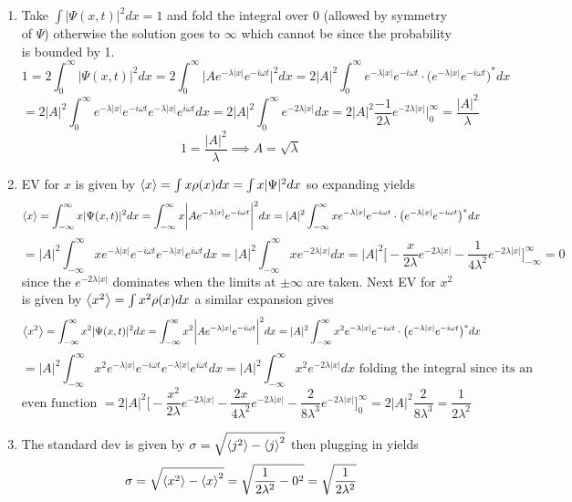 \documentclass[12pt]{exam}
\begin{document}
\begin{solution}
    \begin{enumerate}
        \item Take $\int |\Psi(x,t)|^2dx =1$ and fold the integral over 0 (allowed by symmetry of $\Psi$) otherwise the solution goes to $\infty$ which cannot be since the probability is bounded by 1. 
        $$1=2\int^\infty_0 |\Psi(x,t)|^2dx = 2\int^\infty_0 \bigg|Ae^{-\lambda|x|}e^{-i\omega t}\bigg|^2dx = 2|A|^2\int^\infty_0 e^{-\lambda|x|}e^{-i\omega t} \cdot\big(e^{-\lambda|x|}e^{-i\omega t}\big)^*dx$$
        $$= 2|A|^2\int^\infty_0 e^{-\lambda|x|}e^{-i\omega t} e^{-\lambda|x|}e^{i\omega t}dx = 2|A|^2\int^\infty_0 e^{-2\lambda|x|} dx  = 2|A|^2\frac{-1}{2\lambda}e^{-2\lambda|x|} \bigg|^\infty_0 = \frac{|A|^2}{\lambda}$$
        $$1=\frac{|A|^2}{\lambda}\implies A = \sqrt{\lambda}$$

        \item EV for $x$ is given by $\expval{x} = \int x \rho(x)dx = \int x |\Psi|^2dx$ so expanding yields 
        $$\expval{x} = \int^\infty_{-\infty} x|\Psi(x,t)|^2dx = \int^\infty_{-\infty} x\bigg |Ae^{-\lambda|x|} e^{-i\omega t}\bigg|^2dx = |A|^2\int^\infty_{-\infty} xe^{-\lambda|x|}e^{-i\omega t} \cdot\big(e^{-\lambda|x|}e^{-i\omega t}\big)^*dx$$
        $$= |A|^2\int^\infty_{-\infty} xe^{-\lambda|x|}e^{-i\omega t} e^{-\lambda|x|}e^{i\omega t}dx = |A|^2\int^\infty_{-\infty} xe^{-2\lambda|x|} dx = |A|^2 \bigg[-\frac{x}{2\lambda}e^{-2\lambda|x|} - \frac{1}{4\lambda^2}e^{-2\lambda|x|}\bigg]^\infty_{-\infty} = 0$$
        since the $e^{-2\lambda|x|}$ dominates when the limits at $\pm \infty$ are taken. Next EV for $x^2$ is given by $\expval{x^2} = \int x^2 \rho(x)dx$ a similar expansion gives
         $$\expval{x^2} = \int^\infty_{-\infty} x^2|\Psi(x,t)|^2dx = \int^\infty_{-\infty} x^2\bigg |Ae^{-\lambda|x|} e^{-i\omega t}\bigg|^2dx = |A|^2\int^\infty_{-\infty} x^2e^{-\lambda|x|}e^{-i\omega t} \cdot\big(e^{-\lambda|x|}e^{-i\omega t}\big)^*dx$$
        $$= |A|^2\int^\infty_{-\infty} x^2e^{-\lambda|x|}e^{-i\omega t} e^{-\lambda|x|}e^{i\omega t}dx = |A|^2\int^\infty_{-\infty} x^2e^{-2\lambda|x|} dx \text{ folding the integral since its an}$$
        $$\text{even function }= 2|A|^2 \bigg[-\frac{x^2}{2\lambda}e^{-2\lambda|x|} - \frac{2x}{4\lambda^2}e^{-2\lambda|x|} -\frac{2}{8\lambda^3}e^{-2\lambda|x|}\bigg]^\infty_0 = 2|A|^2\frac{2}{8\lambda^3} = \frac{1}{2\lambda^2}$$

        \item The standard dev is given by $\sigma = \sqrt{\expval{j^2}-\expval{j}^2}$ then plugging in yields
        $$\sigma = \sqrt{\expval{x^2}-\expval{x}^2} = \sqrt{\frac{1}{2\lambda^2}-0^2}=\sqrt{\frac{1}{2\lambda^2}}$$ 


\end{enumerate}
\end{solution}
\end{document}
